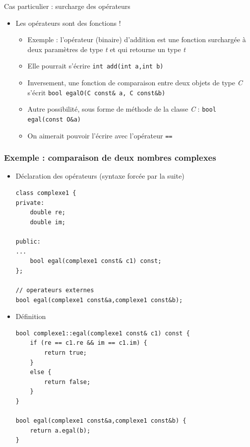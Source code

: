 \begin{frame}{Cas particulier : surcharge des opérateurs}
\begin{itemize}
\item Les opérateurs sont des fonctions !
\begin{itemize}
\item Exemple : l'opérateur (binaire) d'addition est une fonction surchargée à deux paramètres de type \textit{t} et qui retourne un type \textit{t}
\item Elle pourrait s'écrire \texttt{int add(int a,int b)}
\item Inversement, une fonction de comparaison entre deux objets de type \textit{C} s'écrit \texttt{bool egalO(C const\& a, C const\&b)}
\item Autre possibilité, sous forme de méthode de la classe \textit{C} : \texttt{bool egal(const O\&a)}
\item On aimerait pouvoir l'écrire avec l'opérateur \texttt{==}
\end{itemize}
\end{itemize}
\end{frame}

\begin{frame}[fragile]\frametitle{Exemple : comparaison de deux nombres complexes}
\begin{itemize}
\item Déclaration des opérateurs (syntaxe forcée par la suite)
\begin{lstlisting}
class complexe1 {
private:
    double re;
    double im;

public:
...
    bool egal(complexe1 const& c1) const;
};

// operateurs externes
bool egal(complexe1 const&a,complexe1 const&b);
\end{lstlisting}
\item Définition
\begin{lstlisting}
bool complexe1::egal(complexe1 const& c1) const {
    if (re == c1.re && im == c1.im) {
        return true;
    }
    else {
        return false;
    }
}

bool egal(complexe1 const&a,complexe1 const&b) {
    return a.egal(b);
}
\end{lstlisting}
\end{itemize}
\end{frame}

